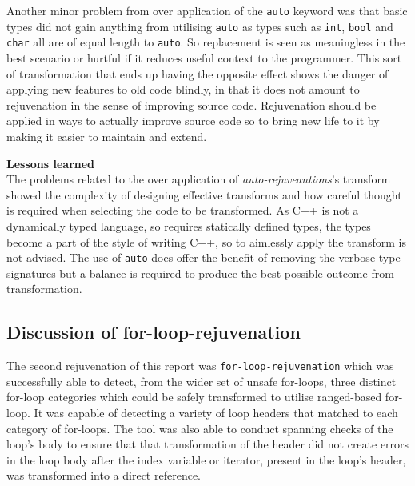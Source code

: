 \documentclass[bsc,frontabs,singlespacing,twoside,parskip,deptreport]{infthesis}
\begin{document}

Another minor problem from over application of the \texttt{auto} keyword was that basic types did not gain anything from utilising \texttt{auto} as types such as \texttt{int}, \texttt{bool} and \texttt{char} all are of equal length to \texttt{auto}. So replacement is seen as meaningless in the best scenario or hurtful if it reduces useful context to the programmer. This sort of transformation that ends up having the opposite effect shows the danger of applying new features to old code blindly, in that it does not amount to rejuvenation in the sense of improving source code. Rejuvenation should be applied in ways to actually improve source code so to bring new life to it by making it easier to maintain and extend. 

\textbf{Lessons learned}\\
The problems related to the over application of \textit{auto-rejuveantions}'s transform showed the complexity of designing effective transforms and how careful thought is required when selecting the code to be transformed. As C++ is not a dynamically typed language, so requires statically defined types, the types become a part of the style of writing C++, so to aimlessly apply the transform is not advised. The use of \texttt{auto} does offer the benefit of removing the verbose type signatures but a balance is required to produce the best possible outcome from transformation. 

\subsection{Discussion of for-loop-rejuvenation}
The second rejuvenation of this report was \texttt{for-loop-rejuvenation} which was successfully able to detect, from the wider set of unsafe for-loops, three distinct for-loop categories which could be safely transformed to utilise ranged-based for-loop. It was capable of detecting a variety of loop headers that matched to each category of for-loops. The tool was also able to conduct spanning checks of the loop's body to ensure that that transformation of the header did not create errors in the loop body after the index variable or iterator, present in the loop's header, was transformed into a direct reference.  
\end{document}
